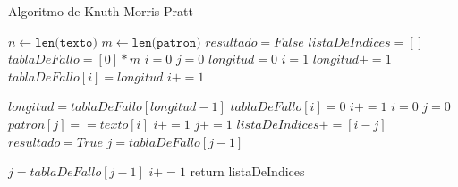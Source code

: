 \begin{algorithm} [H]
    \caption{Algoritmo de Knuth-Morris-Pratt}\label{alg:KMP}
    \begin{algorithmic} [1]
            \State $n \gets \texttt{len(texto)}$
            \State $m \gets \texttt{len(patron)}$
            \State $resultado = False$
            \State $listaDeIndices = []$
            \State $tablaDeFallo = [0]*m$ 
            \State $i = 0$
            \State $j = 0$
                \State $longitud = 0$ 
                \State $i = 1$
                        \State $longitud += 1$
                        \State $tablaDeFallo[i] = longitud$
                        \State $i += 1$
                    
                    \Else 
                            \State $longitud = tablaDeFallo[longitud-1]$
                        \Else
                            \State $tablaDeFallo[i] = 0$
                            \State $i += 1$
                        \EndIf
                    \EndIf
                \EndWhile
            \EndProcedure
                \State $i = 0$
                \State $j = 0$
                    \If $patron[j] == texto[i]$
                        \State $i += 1$
                        \State $j += 1$
                        \EndIf
        \State $listaDeIndices += [i-j]$
        \State $resultado = True$
        \State $j = tablaDeFallo[j-1]$
    \end{algorithmic}
\end{algorithm}

\begin{algorithm} [H]
    \begin{algorithmic} [1]
            \State $j = tablaDeFallo[j-1]$
        \Else 
            \State $i += 1$
        \EndIf
    \EndIf
    \EndWhile
    \EndProcedure
    \State return listaDeIndices
    \EndProcedure
        
    \end{algorithmic}
\end{algorithm}




